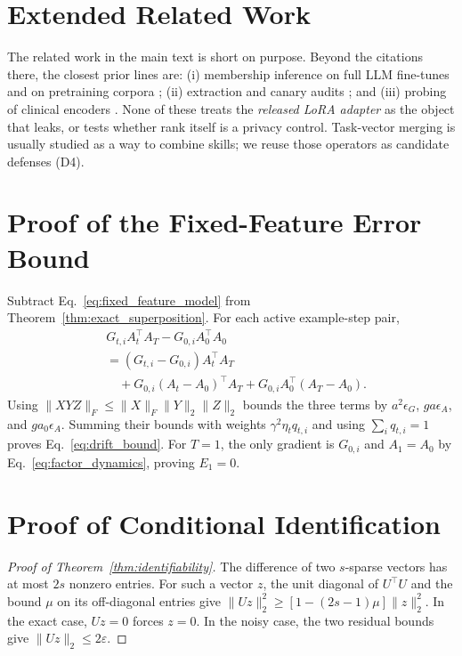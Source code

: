 \documentclass[11pt]{article}
\theoremstyle{plain}
\theoremstyle{definition}
\begin{document}
\appendix
\section{Extended Related Work}\label{app:related}

The related work in the main text is short on purpose. Beyond the citations there, the closest prior lines are:
(i) membership inference on full LLM fine-tunes and on pretraining corpora \citep{mireshghallah2022quantifying,duan2024mia,shi2024detecting};
(ii) extraction and canary audits \citep{carlini2019secret,carlini2021extracting,nasr2023scalable}; and
(iii) probing of clinical encoders \citep{lehman2021bert}.
None of these treats the \emph{released LoRA adapter} as the object that leaks, or tests whether rank itself is a privacy control.
Task-vector merging \citep{ilharco2023task,yadav2023ties,yu2024dare} is usually studied as a way to combine skills; we reuse those operators as candidate defenses (D4).

\section{Proof of the Fixed-Feature Error Bound}
\label{app:drift_proof}

Subtract Eq.~\eqref{eq:fixed_feature_model} from Theorem~\ref{thm:exact_superposition}.
For each active example-step pair,
\begin{align*}
&G_{t,i}A_t^\top A_T-G_{0,i}A_0^\top A_0\\
&=(G_{t,i}-G_{0,i})A_t^\top A_T\\
&\quad+G_{0,i}(A_t-A_0)^\top A_T
+G_{0,i}A_0^\top(A_T-A_0).
\end{align*}
Using $\|XYZ\|_F\leq\|X\|_F\|Y\|_2\|Z\|_2$ bounds the three terms by
$a^2\epsilon_G$, $ga\epsilon_A$, and $ga_0\epsilon_A$.
Summing their bounds with weights $\gamma^2\eta_tq_{t,i}$ and using $\sum_iq_{t,i}=1$ proves Eq.~\eqref{eq:drift_bound}.
For $T=1$, the only gradient is $G_{0,i}$ and $A_1=A_0$ by Eq.~\eqref{eq:factor_dynamics}, proving $E_1=0$.

\section{Proof of Conditional Identification}
\label{app:identification_details}

\begin{proof}[Proof of Theorem~\ref{thm:identifiability}]
The difference of two $s$-sparse vectors has at most $2s$ nonzero entries.
For such a vector $z$, the unit diagonal of $U^\top U$ and the bound $\mu$ on its off-diagonal entries give
$\|Uz\|_2^2\geq[1-(2s-1)\mu]\|z\|_2^2$.
In the exact case, $Uz=0$ forces $z=0$.
In the noisy case, the two residual bounds give $\|Uz\|_2\leq2\varepsilon$.
\end{proof}
\end{document}
